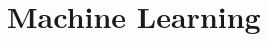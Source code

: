 \documentclass[
a4paper, 
12pt,
grayscalebody, %
abstract=on,
twoside, BCOR10mm, 12pt, DIV13,headinclude, footexclude, final, abstracton, openright
]{ibireprt}
\numberwithin{equation}{chapter}
\numberwithin{table}{chapter}
\numberwithin{figure}{chapter}
\numberwithin{algorithm}{chapter}
\numberwithin{example}{chapter}
\numberwithin{example}{chapter}
\begin{document}



 
\section{Machine Learning}

\end{document}

